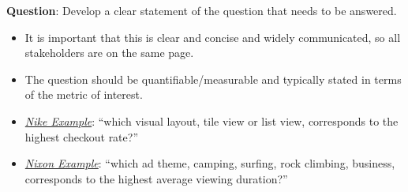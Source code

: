 \begin{framed}
      \textbf{Question}: Develop a clear statement of the question that needs to be answered.
      \begin{itemize}
            \item It is important that this is clear and concise and widely communicated,
                  so all stakeholders are on the same page.
            \item The question should be quantifiable/measurable and typically stated
                  in terms of the metric of interest.
      \end{itemize}
      \begin{Example}{}{}
            \begin{itemize}
                  \item \emph{\hyperref[ex:nike_ex]{Nike Example}}: ``which visual layout, tile view
                        or list view, corresponds to the highest checkout rate?''
                  \item \emph{\hyperref[ex:nixon_ex]{Nixon Example}}:
                        ``which ad theme, camping, surfing, rock climbing, business, corresponds to
                        the highest average viewing duration?''
            \end{itemize}
      \end{Example}
\end{framed}
